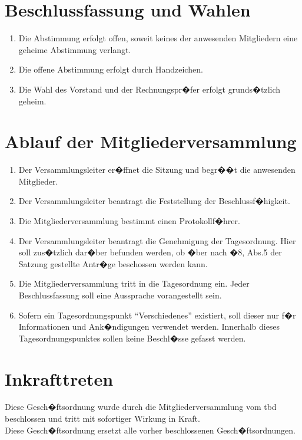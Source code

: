 \documentclass[a4paper, 12pt]{scrartcl}
\begin{document}
\section{Beschlussfassung und Wahlen}
\begin{enumerate}
	\item Die Abstimmung erfolgt offen, soweit keines der anwesenden Mitgliedern eine geheime Abstimmung verlangt.
	\item Die offene Abstimmung erfolgt durch Handzeichen.
	\item Die Wahl des Vorstand und der Rechnungspr�fer erfolgt grunds�tzlich geheim.
\end{enumerate}

\section{Ablauf der Mitgliederversammlung}
\begin{enumerate} 
	\item Der Versammlungsleiter er�ffnet die Sitzung und begr��t die anwesenden Mitglieder.
	\item Der Versammlungsleiter beantragt die Feststellung der Beschlussf�higkeit.
	\item Die Mitgliederversammlung bestimmt einen Protokollf�hrer.
	\item Der Versammlungsleiter beantragt die Genehmigung der Tagesordnung. Hier soll zus�tzlich dar�ber befunden werden, ob �ber nach �8, Abs.5 der Satzung gestellte Antr�ge beschossen werden kann.
	\item Die Mitgliederversammlung tritt in die Tagesordnung ein. Jeder Beschlussfassung soll eine Aussprache vorangestellt sein.
	\item Sofern ein Tagesordnungspunkt "`Verschiedenes"' existiert, soll dieser nur f�r Informationen und Ank�ndigungen verwendet werden. Innerhalb dieses Tagesordnungspunktes sollen keine Beschl�sse gefasst werden.
\end{enumerate}

\section{Inkrafttreten}
Diese Gesch�ftsordnung wurde durch die Mitgliederversammlung vom tbd
beschlossen und tritt mit sofortiger Wirkung in Kraft.\\
Diese Gesch�ftsordnung ersetzt alle vorher beschlossenen Gesch�ftsordnungen.
\end{document}
